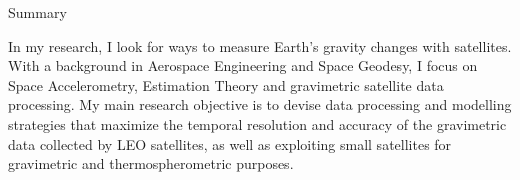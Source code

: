 
\begin{cvtext}{Summary}





In my research, I look for ways to measure Earth's gravity changes with satellites.
With a background in Aerospace Engineering and Space Geodesy, I focus on Space Accelerometry, Estimation Theory and gravimetric satellite data processing.
My main research objective is to devise data processing and modelling strategies that maximize the temporal resolution and accuracy of the gravimetric data collected by LEO satellites, as well as exploiting small satellites for gravimetric and thermospherometric purposes.


\end{cvtext}
